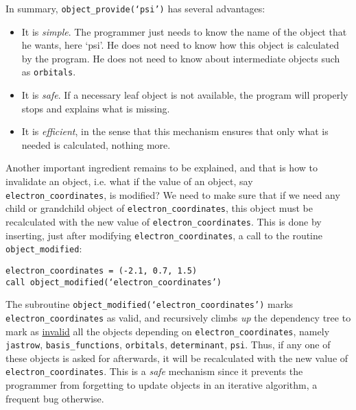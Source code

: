 \documentclass[a4paper,11pt]{article}
\newcommand\Def[1]{\underline{#1}}
\begin{document}
In summary, {\tt object_provide(`psi')} has several advantages:
\begin{itemize}
\item It is {\it simple}. The programmer just needs to know the name of the object that he wants, here `psi'. He does not need to know how this object is calculated by the program. He does not need to know about intermediate objects such as {\tt orbitals}.
\item It is {\it safe}. If a necessary leaf object is not available, the program will properly stops and explains what is missing.
\item It is {\it efficient}, in the sense that this mechanism ensures that only what is needed is calculated, nothing more.
\end{itemize}

\vspace{0.5cm}

Another important ingredient remains to be explained, and that is how to invalidate an object, i.e.
what if the value of an object, say {\tt electron_coordinates}, is modified?
We need to make sure that if we need any child or grandchild object of {\tt electron_coordinates},
this object must be recalculated with the new value of {\tt electron_coordinates}.
This is done by inserting, just after modifying {\tt electron_coordinates},
a call to the routine {\tt object_modified}:

\vspace{0.5cm}
\noindent
{\tt electron_coordinates = (-2.1, 0.7, 1.5)\\
call object_modified(`electron_coordinates')
}

\vspace{0.5cm}
The subroutine {\tt object_modified(`electron_coordinates')} marks {\tt electron_coordinates} as valid, and recursively climbs {\it up} the dependency tree to mark as \Def{invalid} all the objects depending on {\tt electron_coordinates}, namely {\tt jastrow},  {\tt basis_functions}, {\tt orbitals}, {\tt determinant}, {\tt psi}. 
Thus, if any one of these objects is asked for afterwards, it will be recalculated with the new value of {\tt electron_coordinates}. This is a {\it safe} mechanism since it prevents the programmer from forgetting to update objects in an iterative algorithm, a frequent bug otherwise.
\end{document}
